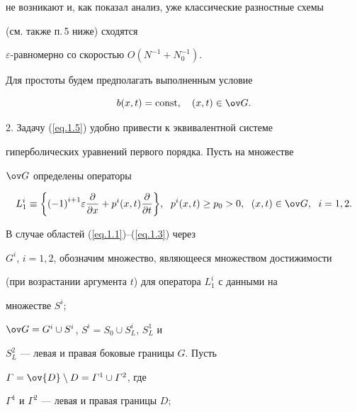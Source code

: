 не возникают и, как показал анализ, уже классические разностные схемы


\cite{2} (см. также п.\,5 ниже) сходятся


$\varepsilon$-равномерно со скоростью $O(N^{-1}+N_0^{-1})$.





Для простоты будем предполагать выполненным условие


$$


b(x,t)=\const, \quad (x, t)\in \ov G.


$$


\medskip





2. Задачу (\ref{eq.1.5}) удобно привести к эквивалентной системе


гиперболических уравнений первого порядка. Пусть на множестве


$\ov G$ определены операторы


\begin{subequations}


\label{eq.1.6}


\begin{equation} \label{eq.1.6a}


L^i_1 \equiv \bigg\{{(-1)}^{i+1} \varepsilon \frac{\partial}{\partial x}+


p^i(x, t) \frac{\partial}{\partial t}\bigg\}, \ \;


p^i(x, t)\ge p_0> 0, \ \; (x, t)\in \ov G, \ \; i=1,2.


\end{equation}


\end{subequations}


В случае областей (\ref{eq.1.1})--(\ref{eq.1.3}) через


$G^i$, $i=1,2$, обозначим множество, являющееся множеством достижимости


(при возрастании аргумента $t$) для оператора $L^i_1$ с данными на


множестве $S^i$;


$\ov G=G^i\cup S^i$, $S^i=S_0\cup S^i_L$, $S^1_L$ и


$S^2_L$ --- левая и правая боковые границы $G$. Пусть


$\varGamma=\ov{D}\setminus D=\varGamma^1\cup \varGamma^2$, где


$\varGamma^1$ и $\varGamma^2$ --- левая и правая границы $D$;


